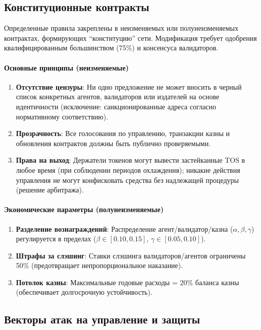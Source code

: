 \documentclass[11pt]{article}
\begin{document}
\subsection{Конституционные контракты}

Определенные правила закреплены в неизменяемых или полунеизменяемых контрактах, формирующих ``конституцию'' сети. Модификация требует одобрения квалифицированным большинством (75\%) и консенсуса валидаторов.

\paragraph{Основные принципы (неизменяемые)}
\begin{enumerate}[noitemsep]
  \item \textbf{Отсутствие цензуры}: Ни одно предложение не может вносить в черный список конкретных агентов, валидаторов или издателей на основе идентичности (исключение: санкционированные адреса согласно нормативному соответствию).
  \item \textbf{Прозрачность}: Все голосования по управлению, транзакции казны и обновления контрактов должны быть публично проверяемыми.
  \item \textbf{Права на выход}: Держатели токенов могут вывести застейканные TOS в любое время (при соблюдении периодов охлаждения); никакие действия управления не могут конфисковать средства без надлежащей процедуры (решение арбитража).
\end{enumerate}

\paragraph{Экономические параметры (полунеизменяемые)}
\begin{enumerate}[noitemsep]
  \item \textbf{Разделение вознаграждений}: Распределение агент/валидатор/казна ($\alpha, \beta, \gamma$) регулируется в пределах ($\beta \in [0.10, 0.15]$, $\gamma \in [0.05, 0.10]$).
  \item \textbf{Штрафы за слэшинг}: Ставки слэшинга валидаторов/агентов ограничены 50\% (предотвращает непропорциональное наказание).
  \item \textbf{Потолок казны}: Максимальные годовые расходы = 20\% баланса казны (обеспечивает долгосрочную устойчивость).
\end{enumerate}

\subsection{Векторы атак на управление и защиты}
\end{document}
